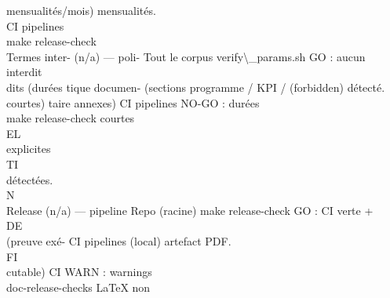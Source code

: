 mensualités/mois)    mensualités.\\
CI pipelines\\
make release-check\\
Termes inter-   (n/a) — poli-    Tout le corpus                verify\textbackslash{}_params.sh    GO : aucun interdit\\
dits (durées    tique documen-   (sections programme / KPI /   (forbidden)         détecté.\\
courtes)        taire            annexes)                      CI pipelines        NO-GO : durées\\
make release-check courtes\\
\vspace{0.5em}
\vspace{0.5em}
\vspace{0.5em}
\vspace{0.5em}
EL\\
explicites\\
\vspace{0.5em}
\vspace{0.5em}
\vspace{0.5em}
\vspace{0.5em}
TI\\
détectées.\\
\vspace{0.5em}
\vspace{0.5em}
\vspace{0.5em}
\vspace{0.5em}
N\\
Release          (n/a) — pipeline Repo (racine)                 make release-check GO : CI verte +\\
\vspace{0.5em}
\vspace{0.5em}
\vspace{0.5em}
\vspace{0.5em}
DE\\
(preuve exé-                      CI pipelines                  (local)             artefact PDF.\\
\vspace{0.5em}
\vspace{0.5em}
\vspace{0.5em}
\vspace{0.5em}
FI\\
cutable)                                                        CI                  WARN : warnings\\
doc-release-checks LaTeX non\\
